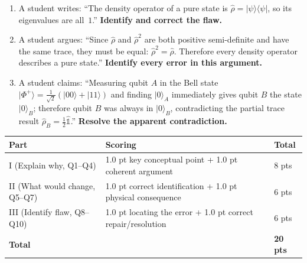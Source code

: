 \documentclass[11pt,a4paper]{article}
\begin{document}
\begin{tcolorbox}[ugconceptbox, title={Part III --- ``Identify the Flaw'' \hfill\normalfont 3 $\times$ 2 pts = 6 pts}]

\begin{enumerate}[leftmargin=1.8em, label=\textbf{Q\arabic*.}, itemsep=14pt, start=8]

\item {}
  A student writes:
  ``The density operator of a pure state is $\hat{\rho}=|\psi\rangle\langle\psi|$,
  so its eigenvalues are all~$1$.''
  \textbf{Identify and correct the flaw.}

  \vspace{2.5cm}

\item {}
  A student argues:
  ``Since $\hat{\rho}$ and $\hat{\rho}^2$ are both positive semi-definite
  and have the same trace, they must be equal: $\hat{\rho}^2=\hat{\rho}$.
  Therefore every density operator describes a pure state.''
  \textbf{Identify every error in this argument.}

  \vspace{3cm}

\item {}
  A student claims:
  ``Measuring qubit $A$ in the Bell state
  $|\Phi^+\rangle=\tfrac{1}{\sqrt{2}}(|00\rangle+|11\rangle)$
  and finding $|0\rangle_A$ immediately gives qubit $B$ the state $|0\rangle_B$;
  therefore qubit $B$ was always in $|0\rangle_B$, contradicting the partial trace
  result $\hat{\rho}_B=\tfrac{1}{2}\hat{\mathbb{1}}$.''
  \textbf{Resolve the apparent contradiction.}

  \vspace{3cm}

\end{enumerate}
\end{tcolorbox}

\begin{tcolorbox}[rubricbox, title={CCQU Rubric}]
\begin{tabular}{lll}
\toprule
Part & Scoring & Total\\
\midrule
I (Explain why, Q1--Q4)        & 1.0 pt key conceptual point + 1.0 pt coherent argument & 8 pts\\
II (What would change, Q5--Q7) & 1.0 pt correct identification + 1.0 pt physical consequence & 6 pts\\
III (Identify flaw, Q8--Q10)   & 1.0 pt locating the error + 1.0 pt correct repair/resolution & 6 pts\\
\midrule
\textbf{Total} & & \textbf{20 pts}\\
\bottomrule
\end{tabular}
\end{tcolorbox}
\end{document}
